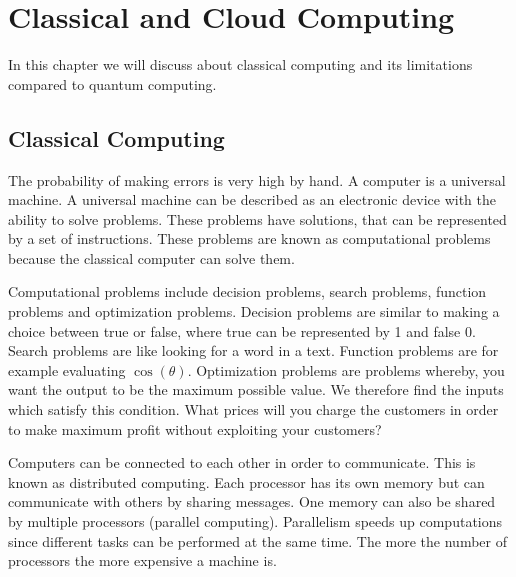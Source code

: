 \chapter{Classical and Cloud Computing}
In this chapter we will discuss about classical computing and its limitations compared to quantum computing.
\section{Classical Computing}

The probability of making errors is very high by hand. A computer is a universal machine. A universal machine can be described as an electronic device with the ability to solve problems. These problems have solutions, that can be represented by a set of instructions. These problems are known as computational problems because the classical computer can solve them. 

Computational problems include decision problems, search problems, function problems and optimization problems.  Decision problems are similar to making a choice between true or false, where true can be represented by 1 and false 0. Search problems are like looking for a word in a text. Function problems are for example evaluating $\cos (\theta)$. Optimization problems are problems whereby, you want the output to be the maximum possible value. We therefore find the inputs which satisfy this condition. What prices will you charge the customers in order to make maximum profit without exploiting your customers?

Computers can be connected to each other in order to communicate. This is known as distributed computing. Each processor has its own memory but can communicate with others by sharing messages. One memory can also be shared by multiple processors (parallel computing). Parallelism speeds up computations since different tasks can be performed at the same time. The more the number of processors the more expensive a machine is. 

